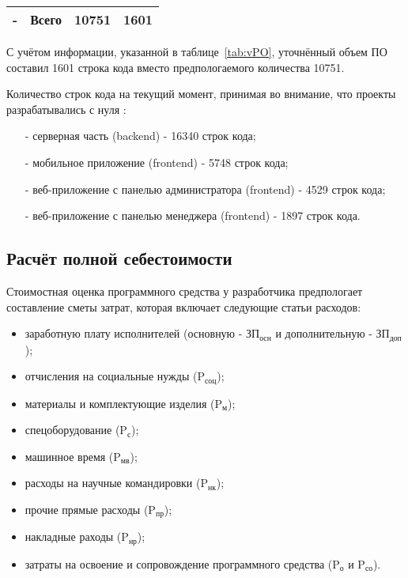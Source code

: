 \begin{table}[h!]
\begin{tabular}{|p{1cm}|p{8.5cm}|p{3cm}|p{3cm}|}
        \multicolumn{1}{|c|}{-}   & Всего                                                   & \multicolumn{1}{r|}{10751}& \multicolumn{1}{r|}{1601} \\ \hline
    \end{tabular}
\end{table}

С учётом информации, указанной в таблице~\ref{tab:vPO}, уточнённый объем ПО составил 1601 строка кода
вместо предпологаемого количества 10751.

Количество строк кода на текущий момент, принимая во внимание, что проекты разрабатывались с нуля \cite{LinuxCloc}:
\begin{enumerate}
    \item[-] серверная часть (backend) - 16340 строк кода;
    \item[-] мобильное приложение (frontend) - 5748 строк кода;
    \item[-] веб-приложение с панелью администратора (frontend) - 4529 строк кода;
    \item[-] веб-приложение с панелью менеджера (frontend) - 1897 строк кода.
\end{enumerate}

\subsection{Расчёт полной себестоимости}

Стоимостная оценка программного средства у разработчика предпологает составление сметы затрат,
которая включает следующие статьи расходов:

\begin{itemize}
    \item заработную плату исполнителей (основную - $\text{ЗП}_{\text{осн}}$ и дополнительную - $\text{ЗП}_{\text{доп}}$);
    \item отчисления на социальные нужды ($\text{P}_{\text{соц}}$);
    \item материалы и комплектующие изделия ($\text{P}_{\text{м}}$);
    \item спецоборудование ($\text{P}_{\text{с}}$);
    \item машинное время ($\text{P}_{\text{мв}}$);
    \item расходы на научные командировки ($\text{P}_{\text{нк}}$);
    \item прочие прямые расходы ($\text{P}_{\text{пр}}$);
    \item накладные раходы ($\text{P}_{\text{нр}}$);
    \item затраты на освоение и сопровождение программного средства ($\text{P}_{\text{о}}$ и $\text{P}_{\text{со}}$).
\end{itemize}

